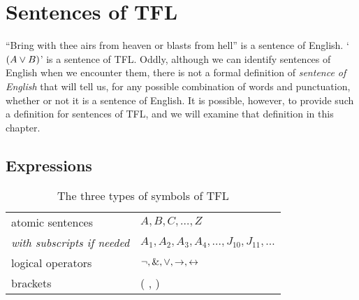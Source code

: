 







\chapter{Sentences of TFL}\label{s:TFLSentences}

``Bring with thee airs from heaven or blasts from hell'' is a sentence of English. `$(A \vee B)$' is a sentence of TFL. Oddly, although we can identify sentences of English when we encounter them, there is not a formal definition of \textit{sentence of English} that will tell us, for any possible combination of words and punctuation, whether or not it is a sentence of English. It is possible, however, to provide such a definition for sentences of TFL, and we will examine that definition in this chapter. 

\section{Expressions}

\begin{table*}\centering\sffamily\footnotesize
{}
\begin{tabular}{@{}l l@{}}\toprule
atomic sentences & $A,B,C,\ldots,Z$\\
\enspace \textit{with subscripts if needed} & $A_1, A_2, A_3,A_4, \ldots, J_{10}, J_{11}, \ldots$\\
logical operators & ${\neg},\mathbin{\&},\vee,\rightarrow,\leftrightarrow$\\
brackets &( , )\\
\bottomrule
\end{tabular}
\caption{The three types of symbols of TFL}\label{table.symbols-TFL}
\label{TFL-symbols}
\end{table*}


